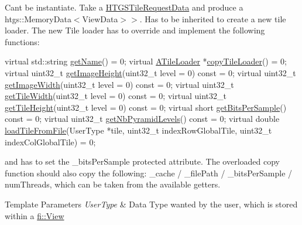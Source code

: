 Can\textquotesingle{}t be instantiate. Take a \hyperlink{classfi_1_1HTGSTileRequestData}{H\+T\+G\+S\+Tile\+Request\+Data} and produce a htgs\+::\+Memory\+Data$<$\+View\+Data$>$$>$. Has to be inherited to create a new tile loader. The new Tile loader has to override and implement the following functions\+: 
\begin{DoxyCode}
\textcolor{keyword}{virtual} std::string \hyperlink{classfi_1_1ATileLoader_abb4cad235d57fbfb29ff5d37caf32a62}{getName}() = 0;
\textcolor{keyword}{virtual} \hyperlink{classfi_1_1ATileLoader_a853a3209bab3a5e024f9d1ca7c8933f3}{ATileLoader} *\hyperlink{classfi_1_1ATileLoader_a99bd30a8283474c5bf667054a83a008d}{copyTileLoader}() = 0;
\textcolor{keyword}{virtual} uint32\_t \hyperlink{classfi_1_1ATileLoader_a53fb257d3ec8f3fa3d5f6c58de859000}{getImageHeight}(uint32\_t level = 0) \textcolor{keyword}{const} = 0;
\textcolor{keyword}{virtual} uint32\_t \hyperlink{classfi_1_1ATileLoader_ad775bcbdddf7da6bb3f857a53c075a86}{getImageWidth}(uint32\_t level = 0) \textcolor{keyword}{const} = 0;
\textcolor{keyword}{virtual} uint32\_t \hyperlink{classfi_1_1ATileLoader_ad4ced663628b4134fd8f7bb0cfd2a652}{getTileWidth}(uint32\_t level = 0) \textcolor{keyword}{const} = 0;
\textcolor{keyword}{virtual} uint32\_t \hyperlink{classfi_1_1ATileLoader_a531ceb7c73457fdde7055e95abd777fa}{getTileHeight}(uint32\_t level = 0) \textcolor{keyword}{const} = 0;
\textcolor{keyword}{virtual} \textcolor{keywordtype}{short} \hyperlink{classfi_1_1ATileLoader_a20ce7ee013801a64dedc95c2a3b9be7f}{getBitsPerSample}() \textcolor{keyword}{const} = 0;
\textcolor{keyword}{virtual} uint32\_t \hyperlink{classfi_1_1ATileLoader_ad6550495be22454b5f72d46c68622c37}{getNbPyramidLevels}() \textcolor{keyword}{const} = 0;
\textcolor{keyword}{virtual} \textcolor{keywordtype}{double} \hyperlink{classfi_1_1ATileLoader_a46d85c52fe89339a3ffbc1cb9c377eb0}{loadTileFromFile}(UserType *tile, uint32\_t
    indexRowGlobalTile, uint32\_t indexColGlobalTile) = 0;
\end{DoxyCode}
 and has to set the \+\_\+bits\+Per\+Sample protected attribute. The overloaded copy function should also copy the following\+: \+\_\+cache / \+\_\+file\+Path / \+\_\+bits\+Per\+Sample / num\+Threads, which can be taken from the available getters. 
\begin{DoxyTemplParams}{Template Parameters}
{\em User\+Type} & Data Type wanted by the user, which is stored within a \hyperlink{classfi_1_1View}{fi\+::\+View} \\
\hline
\end{DoxyTemplParams}


